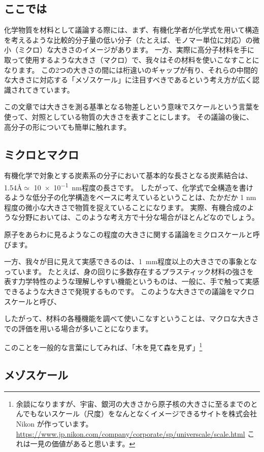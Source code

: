 \documentclass[a4paper,11pt]{ltjsarticle}
\begin{document}
\subsection{ここでは}
化学物質を材料として議論する際には、まず、有機化学者が化学式を用いて構造を考えるような比較的分子量の低い分子（たとえば、モノマー単位に対応）の微小（ミクロ）な大きさのイメージがあります。
一方、実際に高分子材料を手に取って使用するような大きさ（マクロ）で、我々はその材料を使いこなすことになります。
この2つの大きさの間には桁違いのギャップが有り、それらの中間的な大きさに対応する「メゾスケール」に注目すべきであるという考え方が広く認識されてきています。

この文章では大きさを測る基準となる物差しという意味でスケールという言葉を使って、対照としている物質の大きさを表すことにします。
その議論の後に、高分子の形についても簡単に触れます。

\subsection{ミクロとマクロ}

有機化学で対象とする炭素系の分子において基本的な長さとなる炭素結合は、1.54\AA $\simeq$ \qty{10e-1}{\nano\meter}程度の長さです。
したがって、化学式で全構造を書けるような低分子の化学構造をベースに考えているということは、たかだか 1 nm 程度の微小な大きさで物質を捉えていることになります。
実際、有機合成のような分野においては、このような考え方で十分な場合がほとんどなのでしょう。

原子をあらわに見るようなこの程度の大きさに関する議論をミクロスケールと呼びます。

一方、我々が目に見えて実感できるのは、\qty{1}{\mm}程度以上の大きさでの事象となっています。
たとえば、身の回りに多数存在するプラスティック材料の強さを表す力学特性のような理解しやすい機能というものは、一般に、手で触って実感できるような大きさで発現するものです。
このような大きさでの議論をマクロスケールと呼び、

したがって、材料の各種機能を調べて使いこなすということは、マクロな大きさでの評価を用いる場合が多いことになります。

このことを一般的な言葉にしてみれば、「木を見て森を見ず」\footnote{余談になりますが、宇宙、銀河の大きさから原子核の大きさに至るまでのとんでもないスケール（尺度）をなんとなくイメージできるサイトを株式会社 Nikon が作っています。
	\url{https://www.jp.nikon.com/company/corporate/sp/universcale/scale.html}
	これは一見の価値があると思います。
}

\subsection{メゾスケール}
\end{document}
